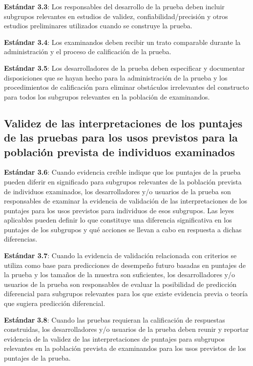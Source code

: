 \documentclass[
  letterpaper,
  DIV=11,
  numbers=noendperiod]{scrreprt}
\begin{document}
\textbf{Estándar 3.3}: Los responsables del desarrollo de la prueba
deben incluir subgrupos relevantes en estudios de validez,
confiabilidad/precisión y otros estudios preliminares utilizados cuando
se construye la prueba.

\textbf{Estándar 3.4}: Los examinandos deben recibir un trato comparable
durante la administración y el proceso de calificación de la prueba.

\textbf{Estándar 3.5}: Los desarrolladores de la prueba deben
especificar y documentar disposiciones que se hayan hecho para la
administración de la prueba y los procedimientos de calificación para
eliminar obstáculos irrelevantes del constructo para todos los subgrupos
relevantes en la población de examinandos.

\subsection{Validez de las interpretaciones de los puntajes de las
pruebas para los usos previstos para la población prevista de individuos
examinados}\label{validez-de-las-interpretaciones-de-los-puntajes-de-las-pruebas-para-los-usos-previstos-para-la-poblaciuxf3n-prevista-de-individuos-examinados}

\textbf{Estándar 3.6}: Cuando evidencia creíble indique que los puntajes
de la prueba pueden diferir en significado para subgrupos relevantes de
la población prevista de individuos examinados, los desarrolladores y/o
usuarios de la prueba son responsables de examinar la evidencia de
validación de las interpretaciones de los puntajes para los usos
previstos para individuos de esos subgrupos. Las leyes aplicables pueden
definir lo que constituye una diferencia significativa en los puntajes
de los subgrupos y qué acciones se llevan a cabo en respuesta a dichas
diferencias.

\textbf{Estándar 3.7}: Cuando la evidencia de validación relacionada con
criterios se utiliza como base para predicciones de desempeño futuro
basadas en puntajes de la prueba y los tamaños de la muestra son
suficientes, los desarrolladores y/o usuarios de la prueba son
responsables de evaluar la posibilidad de predicción diferencial para
subgrupos relevantes para los que existe evidencia previa o teoría que
sugiera predicción diferencial.

\textbf{Estándar} \textbf{3.8}: Cuando las pruebas requieran la
calificación de respuestas construidas, los desarrolladores y/o usuarios
de la prueba deben reunir y reportar evidencia de la validez de las
interpretaciones de puntajes para subgrupos relevantes en la población
prevista de examinandos para los usos previstos de los puntajes de la
prueba.
\end{document}
